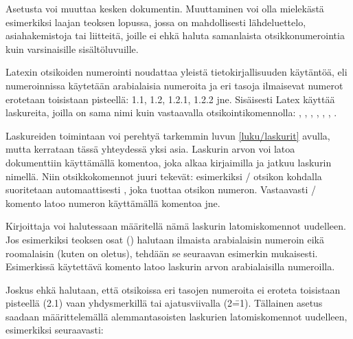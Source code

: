 \noindent
Asetusta voi muuttaa kesken dokumentin. Muuttaminen voi olla mielekästä
esimerkiksi laajan teoksen lopussa, jossa on mahdollisesti
lähdeluettelo, asiahakemistoja tai liitteitä, joille ei ehkä haluta
samanlaista otsikkonumerointia kuin varsinaisille sisältöluvuille.

Latexin otsikoiden numerointi noudattaa yleistä tietokirjallisuuden
käytäntöä, eli numeroinnissa käytetään arabialaisia numeroita ja eri
tasoja ilmaisevat numerot erotetaan toisistaan pisteellä: 1.1, 1.2,
1.2.1, 1.2.2 jne. Sisäisesti Latex käyttää laskureita, joilla on sama
nimi kuin vastaavalla otsikointikomennolla: ,
, , ,
, , .

Laskureiden toimintaan voi perehtyä tarkemmin luvun \ref{luku/laskurit}
avulla, mutta kerrataan tässä yhteydessä yksi asia. Laskurin arvon voi
latoa dokumenttiin käyttämällä komentoa, joka alkaa kirjaimilla
 ja jatkuu laskurin nimellä. Niin otsikkokomennot juuri
tekevät: esimerkiksi \-/ otsikon kohdalla suoritetaan
automaattisesti , joka tuottaa otsikon numeron.
Vastaavasti \-/ komento latoo numeron käyttämällä
komentoa  jne.

Kirjoittaja voi halutessaan määritellä nämä laskurin latomiskomennot
uudelleen. Jos esimerkiksi teoksen osat () halutaan
ilmaista arabialaisin numeroin eikä roomalaisin (kuten on oletus),
tehdään se seuraavan esimerkin mukaisesti. Esimerkissä käytettävä
komento  latoo laskurin arvon arabialaisilla numeroilla.

\begin{koodilohkosis}
\renewcommand{\thepart}{\arabic{part}}
\end{koodilohkosis}

\noindent
Joskus ehkä halutaan, että otsikoissa eri tasojen numeroita ei eroteta
toisistaan pisteellä (2.1) vaan yhdysmerkillä tai ajatusviivalla
(2\==1). Tällainen asetus saadaan määrittelemällä alemmantasoisten
laskurien latomiskomennot uudelleen, esimerkiksi seuraavasti:

\begin{koodilohkosis}
\renewcommand{\thesubsection}{\thesection--\arabic{subsection}}
\renewcommand{\thesubsubsection}{%
  \thesubsection--\arabic{subsubsection}}
\end{koodilohkosis}

